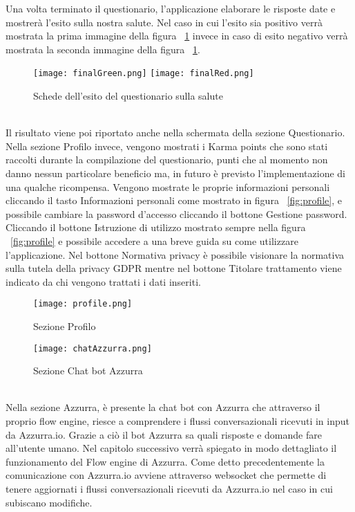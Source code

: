\begin{trivlist}
	Una volta terminato il questionario, l'applicazione elaborare le risposte date e mostrerà l'esito sulla nostra salute. Nel caso in cui l'esito sia positivo verrà mostrata la prima immagine della figura ~\ref{fig:quefinal} invece in caso di esito negativo verrà mostrata la seconda immagine della figura ~\ref{fig:quefinal}.
	\begin{figure}[h]
		\begin{center}
			\texttt{[image: finalGreen.png]}
			\texttt{[image: finalRed.png]}
			\caption{Schede dell'esito del questionario sulla salute}\label{fig:quefinal}
		\end{center}
	\end{figure}\\
	Il risultato viene poi riportato anche nella schermata della sezione Questionario.
	\\
	Nella sezione Profilo invece, vengono mostrati i Karma points che sono stati raccolti durante la compilazione del questionario, punti che al momento non danno nessun particolare beneficio ma, in futuro è previsto l'implementazione di una qualche ricompensa. Vengono mostrate le proprie informazioni personali cliccando il tasto Informazioni personali come mostrato in figura ~\ref{fig:profile}, e possibile cambiare la password d'accesso cliccando il bottone Gestione password. Cliccando il bottone Istruzione di utilizzo mostrato sempre nella figura ~\ref{fig:profile} e possibile accedere a una breve guida su come utilizzare l'applicazione. Nel bottone Normativa privacy è possibile visionare la normativa sulla tutela della privacy GDPR mentre nel bottone Titolare trattamento viene indicato da chi vengono trattati i dati inseriti.
	\begin{figure}[h]
		\begin{center}
			\texttt{[image: profile.png]}
			\caption{Sezione Profilo}\label{fig:profile}
			\texttt{[image: chatAzzurra.png]}
			\caption{Sezione Chat bot Azzurra}\label{fig:Azzurra}
		\end{center}
	\end{figure}\\
	Nella sezione Azzurra, è presente la chat bot con Azzurra che attraverso il proprio flow engine, riesce a comprendere i flussi conversazionali ricevuti in input da Azzurra.io. Grazie a ciò il bot Azzurra sa quali risposte e domande fare all'utente umano. Nel capitolo successivo verrà spiegato in modo dettagliato il funzionamento del Flow engine di Azzurra. Come detto precedentemente la comunicazione con Azzurra.io avviene attraverso websocket che permette di tenere aggiornati i flussi conversazionali ricevuti da Azzurra.io nel caso in cui subiscano modifiche.	
	
\end{trivlist}
